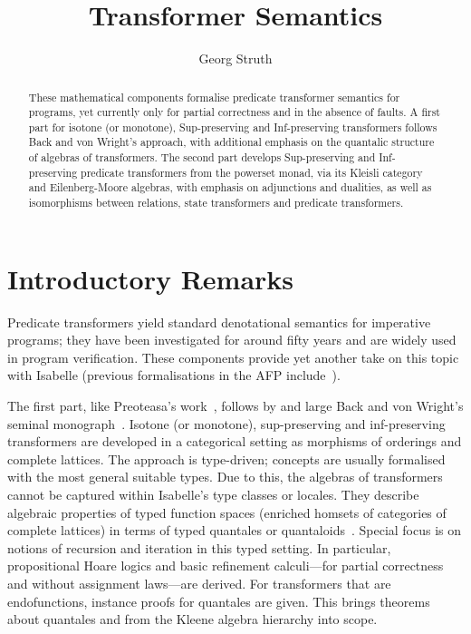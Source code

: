 \documentclass[11pt,a4paper]{article}
\begin{document}
\title{Transformer Semantics}
\author{Georg Struth}
\maketitle

\begin{abstract}
  These mathematical components formalise predicate transformer
  semantics for programs, yet currently only for partial correctness
  and in the absence of faults.  A first part for isotone (or
  monotone), Sup-preserving and Inf-preserving transformers follows
  Back and von Wright's approach, with additional emphasis on the
  quantalic structure of algebras of transformers.  The second part
  develops Sup-preserving and Inf-preserving predicate transformers
  from the powerset monad, via its Kleisli category and
  Eilenberg-Moore algebras, with emphasis on adjunctions and
  dualities, as well as isomorphisms between relations, state
  transformers and predicate transformers.
\end{abstract}

\tableofcontents

\section{Introductory Remarks}

Predicate transformers yield standard denotational semantics for
imperative programs; they have been investigated for around fifty
years and are widely used in program verification.  These components
provide yet another take on this topic with Isabelle (previous
formalisations in the AFP
include~\cite{Preoteasa11b,GomesGHSW16,GomesS16}).

The first part, like Preoteasa's work~\cite{Preoteasa11b}, follows by
and large Back and von Wright's seminal monograph~\cite{BackvW98}.
Isotone (or monotone), sup-preserving and inf-preserving transformers
are developed in a categorical setting as morphisms of orderings and
complete lattices.  The approach is type-driven; concepts are usually
formalised with the most general suitable types. Due to this, the
algebras of transformers cannot be captured within Isabelle's type
classes or locales. They describe algebraic properties of typed
function spaces (enriched homsets of categories of complete lattices)
in terms of typed quantales or quantaloids~\cite{Rosenthal90}. Special
focus is on notions of recursion and iteration in this typed
setting. In particular, propositional Hoare logics and basic
refinement calculi---for partial correctness and without assignment
laws---are derived. For transformers that are endofunctions, instance
proofs for quantales are given. This brings theorems about quantales
and from the Kleene algebra hierarchy into scope.
\end{document}
